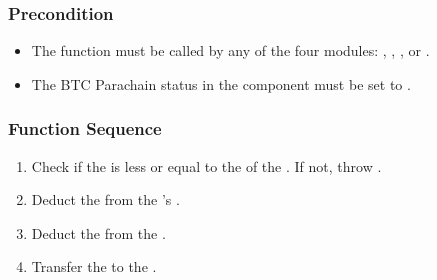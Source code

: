 \documentclass[a4paper,10pt,english]{sphinxmanual}
\begin{document}
\subsubsection{Precondition}
\label{\detokenize{spec/collateral:id8}}\begin{itemize}
\item {} 
The function must be called by any of the four modules: {\hyperref[\detokenize{spec/issue:issue-protocol}]{}}, {\hyperref[\detokenize{spec/redeem:redeem-protocol}]{}}, {\hyperref[\detokenize{spec/replace:replace-protocol}]{}}, or {\hyperref[\detokenize{spec/vault-registry:vault-registry}]{}}.

\item {} 
The BTC Parachain status in the {\hyperref[\detokenize{spec/security:security}]{}} component must be set to .

\end{itemize}


\subsubsection{Function Sequence}
\label{\detokenize{spec/collateral:id9}}\begin{enumerate}
%
\item {} 
Check if the  is less or equal to the  of the . If not, throw .

\item {} 
Deduct the  from the ’s .

\item {} 
Deduct the  from the .

\item {} 
Transfer the  to the .

\end{enumerate}
\end{document}
